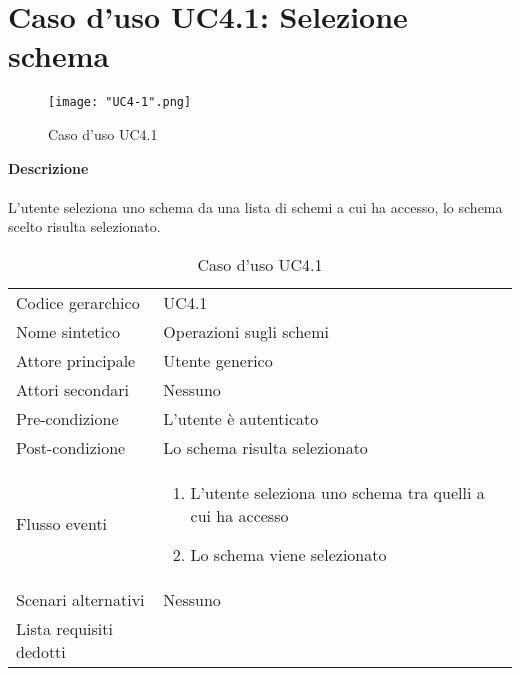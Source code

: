 \documentclass[a4paper]{report}
\begin{document}
	 \section{Caso d'uso UC4.1: Selezione schema}
	 	\begin{figure}[H]
			\centering
			\texttt{[image: "UC4-1".png]}
			\caption{Caso d'uso UC4.1}
		\end{figure}
	 \textbf{Descrizione} \\ \\
	 L'utente seleziona uno schema da una lista di schemi a cui ha accesso, lo schema scelto risulta
	  selezionato.
		\begin{table}[H]
		\begin{tabularx}{\textwidth}{X | X}\toprule
			\rowcolor{orange!65}Codice gerarchico & UC4.1 \\
			Nome sintetico & Operazioni sugli schemi \\
			\rowcolor{orange!65}Attore principale & Utente generico\\
			Attori secondari & Nessuno \\
			\rowcolor{orange!65}Pre-condizione & L'utente è autenticato\\
			Post-condizione & Lo schema risulta selezionato \\
			\rowcolor{orange!65}Flusso eventi & \begin{enumerate}
			\item L'utente seleziona uno schema tra quelli a cui ha accesso
			\item Lo schema viene selezionato
			\end{enumerate} \\
			Scenari alternativi &  Nessuno \\
			\rowcolor{orange!65}Lista requisiti dedotti & \\
			\bottomrule
		\end{tabularx}
		\caption{Caso d'uso UC4.1}
	 \end{table}
\end{document}
